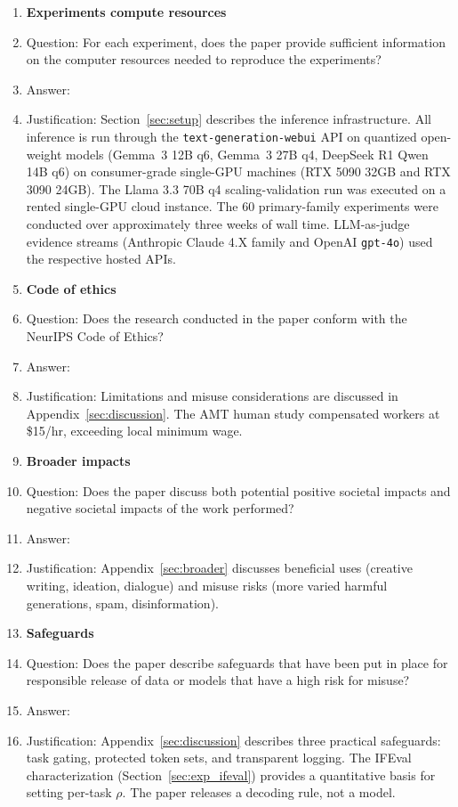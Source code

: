 \documentclass{article}
\begin{document}
\begin{enumerate}
\item {\bf Experiments compute resources}
    \item[] Question: For each experiment, does the paper provide sufficient information on the computer resources needed to reproduce the experiments?
    \item[] Answer: \answerYes{}
    \item[] Justification: Section~\ref{sec:setup} describes the inference infrastructure. All inference is run through the \texttt{text-generation-webui} API on quantized open-weight models (Gemma~3 12B q6, Gemma~3 27B q4, DeepSeek R1 Qwen 14B q6) on consumer-grade single-GPU machines (RTX 5090 32GB and RTX 3090 24GB). The Llama 3.3 70B q4 scaling-validation run was executed on a rented single-GPU cloud instance. The 60 primary-family experiments were conducted over approximately three weeks of wall time. LLM-as-judge evidence streams (Anthropic Claude 4.X family and OpenAI \texttt{gpt-4o}) used the respective hosted APIs.

\item {\bf Code of ethics}
    \item[] Question: Does the research conducted in the paper conform with the NeurIPS Code of Ethics?
    \item[] Answer: \answerYes{}
    \item[] Justification: Limitations and misuse considerations are discussed in Appendix~\ref{sec:discussion}. The AMT human study compensated workers at \$15/hr, exceeding local minimum wage.

\item {\bf Broader impacts}
    \item[] Question: Does the paper discuss both potential positive societal impacts and negative societal impacts of the work performed?
    \item[] Answer: \answerYes{}
    \item[] Justification: Appendix~\ref{sec:broader} discusses beneficial uses (creative writing, ideation, dialogue) and misuse risks (more varied harmful generations, spam, disinformation).

\item {\bf Safeguards}
    \item[] Question: Does the paper describe safeguards that have been put in place for responsible release of data or models that have a high risk for misuse?
    \item[] Answer: \answerYes{}
    \item[] Justification: Appendix~\ref{sec:discussion} describes three practical safeguards: task gating, protected token sets, and transparent logging. The IFEval characterization (Section~\ref{sec:exp_ifeval}) provides a quantitative basis for setting per-task $\rho$. The paper releases a decoding rule, not a model.


\end{enumerate}
\end{document}
